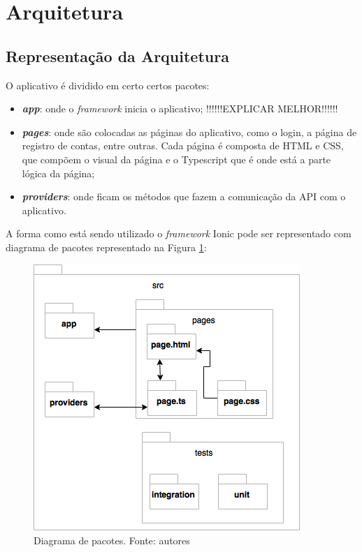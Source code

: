 \section{Arquitetura}

\subsection{Representação da Arquitetura}

O aplicativo é dividido em certo certos pacotes: 

\begin{itemize}
\item\textbf{\textit{app}}: onde o \textit{framework} inicia o aplicativo; !!!!!!EXPLICAR MELHOR!!!!!!
\item\textbf{\textit{pages}}: onde são colocadas as páginas do aplicativo, como o login, a página de registro de contas, entre outras. Cada página é composta de HTML e CSS, que compõem o visual da página e o Typescript que é onde está a parte lógica da página; 
\item\textbf{\textit{providers}}: onde ficam os métodos que fazem a comunicação da API com o aplicativo.
\end{itemize}

A forma como está sendo utilizado o \textit{framework} Ionic pode ser representado com diagrama de pacotes representado na Figura \ref{img:pacotes}:

\begin{figure}[H]
    \centering
    \includegraphics[scale=0.5]{figuras/ionic_arch.png}
    \caption[Diagrama de pacotes do aplicativo]{Diagrama de pacotes. Fonte: autores}
    \label{img:pacotes}
\end{figure}
\pagebreak

